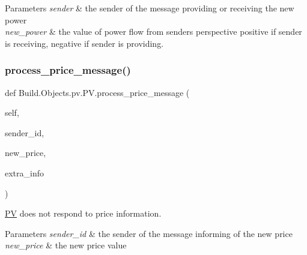 \begin{DoxyParams}{Parameters}
{\em sender} & the sender of the message providing or receiving the new power \\
\hline
{\em new\+\_\+power} & the value of power flow from sender\textquotesingle{}s perspective positive if sender is receiving, negative if sender is providing. \\
\hline
\end{DoxyParams}
\mbox{\label{class_build_1_1_objects_1_1pv_1_1_p_v_a5f41b238d5d48ac989782e1c6fffaa54}} 
\subsubsection{\texorpdfstring{process\+\_\+price\+\_\+message()}{process\_price\_message()}}
{\footnotesize\ttfamily def Build.\+Objects.\+pv.\+P\+V.\+process\+\_\+price\+\_\+message (\begin{DoxyParamCaption}\item[{}]{self,  }\item[{}]{sender\+\_\+id,  }\item[{}]{new\+\_\+price,  }\item[{}]{extra\+\_\+info }\end{DoxyParamCaption})}



\hyperlink{class_build_1_1_objects_1_1pv_1_1_p_v}{PV} does not respond to price information. 


\begin{DoxyParams}{Parameters}
{\em sender\+\_\+id} & the sender of the message informing of the new price \\
\hline
{\em new\+\_\+price} & the new price value \\
\hline
\end{DoxyParams}
\mbox{\label{class_build_1_1_objects_1_1pv_1_1_p_v_ab560ae3ebbbb4c57382daa39d39fe654}} 
